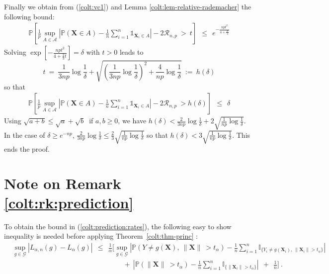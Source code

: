\noindent
Finally we obtain from (\ref{colt:vc1}) and Lemma \ref{colt:lem-relative-rademacher} the following bound:
\begin{align}
\label{colt:prop-princ}
\mathbb{P} \left [ \frac{1}{p} \sup_{A \in \mathcal{A}} \left | \mathbb{P}(\mathbf{X} \in A) - \frac{1}{n} \sum_{i=1}^n \mathds{1}_{\mathbf{X}_i \in A} \right| - 2 \mathcal{R}_{n,p} ~>~ t \right] ~~\le~~ e^{-\frac{np t^2}{4 + \frac{2t}{3}} }
\end{align}
\noindent
Solving $ \exp \left [ - \frac{np t^2}{4  + \frac{2}{3} t}\right]=\delta$ with $t > 0$ leads to $$t ~=~ \frac{1}{3np} \log \frac{1}{\delta} + \sqrt{\left ( \frac{1}{3np} \log \frac{1}{\delta}\right)^{2} + \frac{4}{np} \log \frac{1}{\delta} } ~:=~h(\delta)$$ so that
\begin{align*}
\mathbb{P} \left [ \frac{1}{p} \sup_{A \in \mathcal{A}} \left | \mathbb{P}(\mathbf{X} \in A) - \frac{1}{n} \sum_{i=1}^n \mathds{1}_{\mathbf{X}_i \in A} \right| - 2 \mathcal{R}_{n,p} ~> h(\delta) \right] ~~\le~~ \delta
\end{align*}
\noindent
Using $\sqrt{a+b} \le \sqrt a + \sqrt b~$ if $a,b \ge 0$, we have $h(\delta) < \frac{2}{3np} \log \frac{1}{\delta} + 2 \sqrt{\frac{1}{np} \log \frac{1}{\delta}} $. In the case of $\delta \ge e^{-np}$, $\frac{2}{3np} \log \frac{1}{\delta} \le \frac{2}{3} \sqrt{ \frac{1}{np}\log \frac{1}{\delta}} $ so that 
$h(\delta) < 3 \sqrt{\frac{1}{np} \log \frac{1}{\delta}} $. This ends the proof.









\section{Note on Remark \ref{colt:rk:prediction}}
To obtain the bound in (\ref{colt:prediction:rates}), the following easy to show inequality is needed before  applying Theorem~\ref{colt:thm-princ} :
\begin{align*}
&\sup_{g\in \mathcal{G}}| {L}_{\alpha, n}(g)- L_{\alpha}(g)  | ~~ \le ~~ \frac{1}{\alpha} \Bigg[ \sup_{g\in \mathcal{G}} \left| \mathbb{P} \left(Y\neq g(\mathbf{X}),~ \| \mathbf{X}\|\ >t_\alpha \right) - \frac{1}{n}\sum_{i=1}^n\mathds{I}_{\{Y_i\neq
   g(\mathbf{X}_i),~ \| \mathbf{X}_i\| > t_\alpha \}} \right| \\
&~~~~~~~~~~~~~~~~~~~~~~~~~~~~~~~~~~~~~~~~~~~~~~~~~~~~~~~~~~~~~~~~~~~~~~~~+~ \left| \mathbb{P} \left(\| \mathbf{X}\|\ >t_\alpha \right) - \frac{1}{n}\sum_{i=1}^n\mathds{I}_{\{ \| \mathbf{X}_i\| > t_\alpha  \}} \right| ~~+~~ \frac{1}{n}  \Bigg] ~.
\end{align*}


